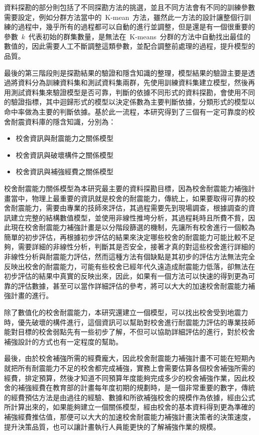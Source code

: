 資料探勘的部分則包括了不同探勘方法的挑選，並且不同方法會有不同的訓練參數需要設定，例如分群方法當中的~K-mean~方法，雖然此一方法的設計讓整個行訓練的過程中，幾乎所有的過程都可以自動的進行並調整，但是還是有一個很重要的參數~$k$~代表初始的群集數量，是無法在~K-means~分群的方法中自動找出最佳的數值的，因此需要人工不斷調整這類參數，並配合調整前處理的過程，提升模型的品質。

最後的第三階段則是探勘結果的驗證和隱含知識的整理，模型結果的驗證主要是透過將資料分為訓練資料集和測試資料集兩群，先使用訓練資料集建立模型，然後再用測試資料集來驗證模型是否可靠，判斷的依據不同形式的資料探勘，會使用不同的驗證指標，其中迴歸形式的模型以決定係數為主要判斷依據，分類形式的模型以命中率做為主要的判斷依據。基於此一流程，本研究得到了三個有一定可靠度的校舍耐震資料庫的隱含知識，分別為：

\begin{itemize}
\item 校舍資訊與耐震能力之關係模型
\item 校舍資訊與破壞構件之關係模型
\item 校舍資訊與補強經費之關係模型
\end{itemize}

校舍耐震能力關係模型為本研究最主要的資料探勘目標，因為校舍耐震能力補強計畫當中，物理上最重要的資訊就是校舍的耐震能力，傳統上，如果要取得可靠的校舍耐震能力，需要由專業的技師來評估，其過程需要先到現場調查，根據調查的資訊建立完整的結構數值模型，並使用非線性推垮分析，其過程耗時且所費不貲，因此現在校舍耐震能力補強計畫是以分階段篩選的機制，先讓所有校舍進行一個較為簡單的初步評估，再根據初步評估的結果來決定哪些校舍的耐震能力可能比較不足夠，需要詳細的非線性分析，判斷其是否安全，接著才真的對這些校舍進行詳細的非線性分析與耐震能力評估，然而這種方法有個缺點是其初步的評估方法無法完全反映出校舍的耐震能力，可能有些校舍已經年代久遠造成耐震能力低落，卻無法在初步評估的結果中真實的反映出來，因此，如果有一個方法可以快速的得到更為可靠的評估數據，甚至可以當作詳細評估的參考，將可以大大的加速校舍耐震能力補強計畫的進行。

除了數值化的校舍耐震能力，本研究還建立一個模型，可以找出校舍受到地震力時，優先破壞的構件進行，這個資訊可以幫助對校舍進行耐震能力評估的專業技師能對目標的校舍弱點先有一些初步了解，不但可以協助詳細評估的進行，對於校舍補強設計的方式也有一定程度的幫助。

最後，由於校舍補強所需的經費龐大，因此校舍耐震能力補強計畫不可能在短期內就把所有耐震能力不足的校舍都完成補強，實務上會需要估算各個校舍補強所需的經費，排定預算，然後才知道不同預算年度能夠完成多少的校舍補強作業，因此校舍的補強經費在教育部的計畫每年度初期的規劃時，是一個非常重要的數字，傳統的經費預估方法是由過往的經驗、數據和所欲補強校舍的規模作為依據，經由公式所計算出來的，如果能夠建立一個關係模型，經由校舍的基本資料得到更為準確的補強經費推估值，那便可以大大的加速校舍耐震能力補強計畫決策者的決策速度，提升決策品質，也可以讓計畫執行人員能更快的了解補強作業的規模。

